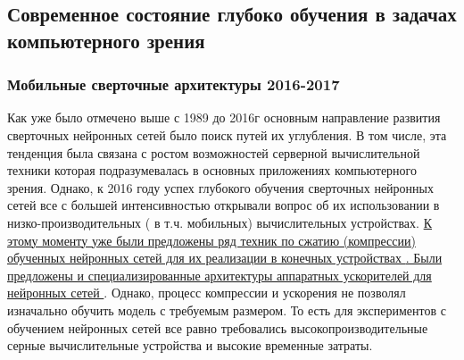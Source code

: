 \documentclass[12pt]{article}
\begin{document}
\begin{sloppypar}
\newpage
\subsection{Современное состояние глубоко обучения в задачах компьютерного зрения}
\subsubsection{Мобильные сверточные архитектуры 2016-2017}
Как уже было отмечено выше с 1989 до 2016г основным направление развития сверточных нейронных сетей было поиск путей их углубления. В том числе, эта тенденция была связана с ростом возможностей серверной вычислительной техники которая подразумевалась в основных приложениях компьютерного зрения. Однако, к 2016 году успех глубокого обучения сверточных нейронных сетей все с большей интенсивностью открывали вопрос об их использовании в низко-производительных ( в т.ч. мобильных) вычислительных устройствах. \uline{К этому моменту уже были предложены ряд техник по сжатию (компрессии) обученных нейронных сетей для их реализации в конечных устройствах \cite{mishra2020survey}. Были предложены и специализированные архитектуры аппаратных ускорителей для нейронных сетей \cite{reagen2016minerva}}. Однако, процесс компрессии и ускорения не позволял изначально обучить модель с требуемым размером. То есть для экспериментов с обучением нейронных сетей все равно требовались высокопроизводительные серные вычислительные устройства и высокие временные затраты. 


\end{sloppypar}
\end{document}
